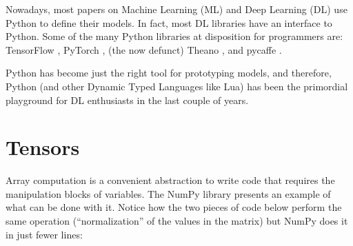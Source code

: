 Nowadays, most papers on Machine Learning (ML) and Deep Learning (DL)
use Python to define their models. In fact, most DL libraries have an
interface to Python. Some of the many Python libraries at disposition
for programmers are: TensorFlow \autocite{abadi_tensorflow_2016},
PyTorch \autocite{paszke2017pytorch}, (the now defunct) Theano
\autocite{bergstra2011theano}, and pycaffe \autocite[as part of the
Caffe framework]{jia2014caffe}.

Python has become just the right tool for prototyping models, and
therefore, Python (and other Dynamic Typed Languages like Lua) has been
the primordial playground for DL enthusiasts in the last couple of
years.

\section{Tensors}\label{tensors}

Array computation is a convenient abstraction to write code that
requires the manipulation blocks of variables. The NumPy library
presents an example of what can be done with it. Notice how the two
pieces of code below perform the same operation (\enquote{normalization}
of the values in the matrix) but NumPy does it in just fewer lines:

\begin{Shaded}
\begin{Highlighting}[]
\OperatorTok{=}\NormalTok{ np.array([}
\NormalTok{  [}\NormalTok{, }\NormalTok{, }\NormalTok{],}
\NormalTok{  [}\NormalTok{, }\NormalTok{, }\NormalTok{],}
\NormalTok{  [}\NormalTok{, }\NormalTok{, }\NormalTok{],}
\NormalTok{])}

\OperatorTok{/=}
\end{Highlighting}
\end{Shaded}

\begin{Shaded}
\begin{Highlighting}[]
\OperatorTok{=}\NormalTok{ [}
\NormalTok{  [}\NormalTok{, }\NormalTok{, }\NormalTok{],}
\NormalTok{  [}\NormalTok{, }\NormalTok{, }\NormalTok{],}
\NormalTok{  [}\NormalTok{, }\NormalTok{, }\NormalTok{],}
\NormalTok{]}

\OperatorTok{=} \NormalTok{(}\NormalTok{(}
 \NormalTok{(}\NormalTok{):}
   \NormalTok{(}\NormalTok{):}
\OperatorTok{/=}
\end{Highlighting}
\end{Shaded}

